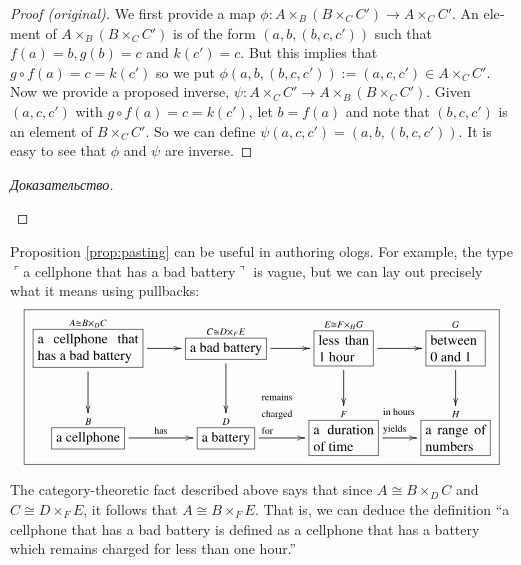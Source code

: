 \documentclass[a4paper]{book}
\def\tn{\textnormal}
\def\to{\rightarrow}
\def\taking{\colon}
\def\iso{\cong}
\def\rr{\raggedright}
\newcommand{\LA}[2]{\ar[#1]^-{\tn {#2}}}
\newcommand{\obox}[3]{\stackrel{#1}{\fbox{\parbox{#2}{#3}}}}
\newcommand{\smbox}[2]{\stackrel{#1}{\fbox{#2}}}
\newcommand{\fakebox}[1]{\tn{$\ulcorner$#1$\urcorner$}}
\theoremstyle{myth}
\newenvironment{proofENG}{\begin{proof}[Proof (original)]}{\end{proof}}
\newtheorem{propositionRUS}[envRUS]{\begin{russian}Утверждение\end{russian}}
\newenvironment{proofRUS}{\begin{proof}[Доказательство]}{\end{proof}}
\begin{document}
\begin{english}
\begin{propositionRUS}\label{prop:pasting}
\begin{russian} \end{russian}
\end{propositionRUS}

\begin{proofENG}
We first provide a map $\phi\taking A\times_B(B\times_CC')\to A\times_CC'$. An element of $A\times_B(B\times_CC')$ is of the form $(a,b,(b,c,c'))$ such that $f(a)=b, g(b)=c$ and $k(c')=c$. But this implies that $g\circ f(a)=c=k(c')$ so we put $\phi(a,b,(b,c,c')):=(a,c,c')\in A\times_CC'$. Now we provide a proposed inverse, $\psi\taking A\times_CC'\to A\times_B(B\times_CC')$. Given $(a,c,c')$ with $g\circ f(a)=c=k(c')$, let $b=f(a)$ and note that $(b,c,c')$ is an element of $B\times_CC'$. So we can define $\psi(a,c,c')=(a,b,(b,c,c'))$. It is easy to see that $\phi$ and $\psi$ are inverse.
\end{proofENG}

\begin{proofRUS}
\begin{russian} \end{russian}
\end{proofRUS}

Proposition \ref{prop:pasting} can be useful in authoring ologs. For example, the type \fakebox{a cellphone that has a bad battery} is vague, but we can lay out precisely what it means using pullbacks:
\small
\begin{align}\label{dia:bad battery}
\fbox{\xymatrixnocompile{\obox{A\iso B\times_DC}{1in}{a cellphone that has a bad battery}\ar[r]\ar[d]&\smbox{C\iso D\times_FE}{a bad battery}\ar[r]\ar[d]&\obox{E\iso F\times_HG}{.5in}{less than 1 hour}\ar[r]\ar[d]&\obox{G}{.5in}{between 0 and 1}\ar[d]\\\smbox{B}{a cellphone}\LA{r}{has}&\smbox{D}{a battery}\LA{r}{\parbox{.4in}{\rr remains charged for}}&\obox{F}{.6in}{a duration of time}\LA{r}{\hspace{.07in}\parbox{.4in}{\rr in hours yields}}&\obox{H}{.6in}{a range of numbers}}}
\end{align}\normalsize

\begin{russian} \end{russian}

The category-theoretic fact described above says that since $A\iso B\times_DC$ and $C\iso D\times_FE$, it follows that $A\iso B\times_FE$.  That is, we can deduce the definition “a cellphone that has a bad battery is defined as a cellphone that has a battery which remains charged for less than one hour.”  


\end{english}
\end{document}
